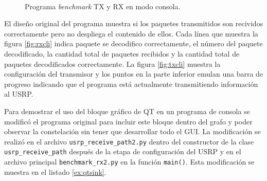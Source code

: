 \begin{figure}[htp]
  \centering
  \\
  \vspace{0.5in}
  \caption{Programa \emph{benchmark} TX y RX en modo consola.}
  \label{fig:benchcli}
\end{figure}

El dise\~no original del programa muestra si los paquetes transmitidos son recividos
correctamente pero no despliega el contenido de ellos. Cada l\'inea que muestra la figura
\ref{fig:rxcli} indica paquete se decodifico correctamente, el n\'umero del paquete decodificado, la
cantidad total de paquetes recibidos y la cantidad total de paquetes decodificados correctamente. La
figura \ref{fig:txcli} muestra la configuraci\'on del transmisor y los puntos en la parte
inferior emulan una barra de progreso indicando que el programa est\'a actualmente transmitiendo
informaci\'on al USRP.

Para demostrar el uso del bloque gr\'afico de QT en un programa de consola se modific\'o el programa
original para incluir este bloque dentro del grafo y poder observar la constelaci\'on sin tener que
desarrollar todo el GUI. La modificaci\'on se realiz\'o en el archivo \verb|usrp_receive_path2.py|
dentro del constructor de la clase \verb|usrp_receive_path| despu\'es de la etapa de configuraci\'on
del USRP y en el archivo principal \verb|benchmark_rx2.py| en la funci\'on \verb|main()|. Esta
modificaci\'on se muestra en el listado \ref{ex:qtsink}.

